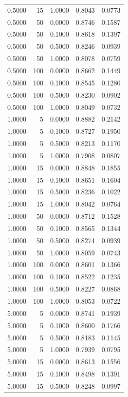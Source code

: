 \begin{longtable}{lrrrr}
0.5000 & 15 & 1.0000 & 0.8043 & 0.0773 \\
0.5000 & 50 & 0.0000 & 0.8746 & 0.1587 \\
0.5000 & 50 & 0.1000 & 0.8618 & 0.1397 \\
0.5000 & 50 & 0.5000 & 0.8246 & 0.0939 \\
0.5000 & 50 & 1.0000 & 0.8078 & 0.0759 \\
0.5000 & 100 & 0.0000 & 0.8662 & 0.1449 \\
0.5000 & 100 & 0.1000 & 0.8545 & 0.1280 \\
0.5000 & 100 & 0.5000 & 0.8230 & 0.0902 \\
0.5000 & 100 & 1.0000 & 0.8049 & 0.0732 \\
1.0000 & 5 & 0.0000 & 0.8882 & 0.2142 \\
1.0000 & 5 & 0.1000 & 0.8727 & 0.1950 \\
1.0000 & 5 & 0.5000 & 0.8213 & 0.1170 \\
1.0000 & 5 & 1.0000 & 0.7908 & 0.0807 \\
1.0000 & 15 & 0.0000 & 0.8848 & 0.1855 \\
1.0000 & 15 & 0.1000 & 0.8651 & 0.1604 \\
1.0000 & 15 & 0.5000 & 0.8236 & 0.1022 \\
1.0000 & 15 & 1.0000 & 0.8042 & 0.0764 \\
1.0000 & 50 & 0.0000 & 0.8712 & 0.1528 \\
1.0000 & 50 & 0.1000 & 0.8565 & 0.1344 \\
1.0000 & 50 & 0.5000 & 0.8274 & 0.0939 \\
1.0000 & 50 & 1.0000 & 0.8059 & 0.0743 \\
1.0000 & 100 & 0.0000 & 0.8601 & 0.1366 \\
1.0000 & 100 & 0.1000 & 0.8522 & 0.1235 \\
1.0000 & 100 & 0.5000 & 0.8227 & 0.0868 \\
1.0000 & 100 & 1.0000 & 0.8053 & 0.0722 \\
5.0000 & 5 & 0.0000 & 0.8741 & 0.1939 \\
5.0000 & 5 & 0.1000 & 0.8600 & 0.1766 \\
5.0000 & 5 & 0.5000 & 0.8183 & 0.1145 \\
5.0000 & 5 & 1.0000 & 0.7939 & 0.0795 \\
5.0000 & 15 & 0.0000 & 0.8613 & 0.1556 \\
5.0000 & 15 & 0.1000 & 0.8498 & 0.1391 \\
5.0000 & 15 & 0.5000 & 0.8248 & 0.0997 \\

\end{longtable}
